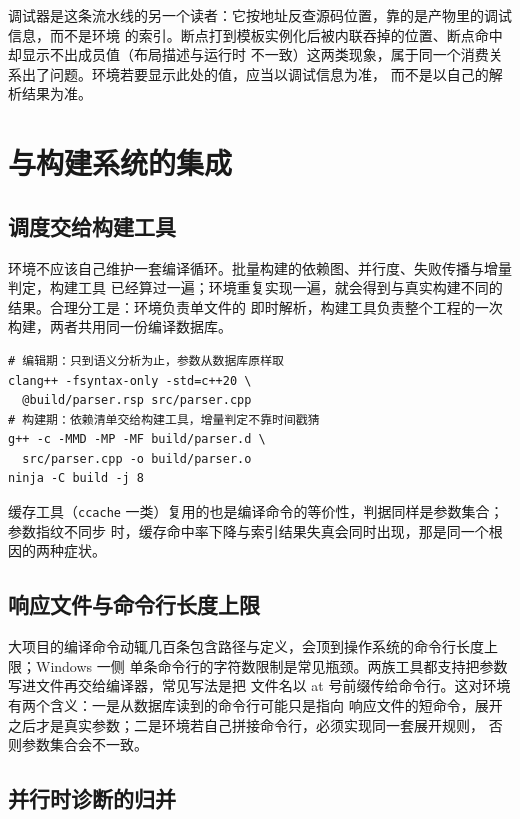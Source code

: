 \documentclass[12pt,a4paper,fontset=fandol]{ctexbook}
\newcommand{\Tool}[1]{\texttt{#1}}
\newcommand{\Win}{\textsf{Windows}}
\begin{document}
调试器是这条流水线的另一个读者：它按地址反查源码位置，靠的是产物里的调试信息，而不是环境
的索引。断点打到模板实例化后被内联吞掉的位置、断点命中却显示不出成员值（布局描述与运行时
不一致）这两类现象，属于同一个消费关系出了问题。环境若要显示此处的值，应当以调试信息为准，
而不是以自己的解析结果为准。

\section{与构建系统的集成}\label{sec:cl14-buildsys}

\subsection{调度交给构建工具}\label{sec:cl14-scheduling}

环境不应该自己维护一套编译循环。批量构建的依赖图、并行度、失败传播与增量判定，构建工具
已经算过一遍；环境重复实现一遍，就会得到与真实构建不同的结果。合理分工是：环境负责单文件的
即时解析，构建工具负责整个工程的一次构建，两者共用同一份编译数据库。

\begin{lstlisting}[style=shellstyle, caption={编辑期与构建期各走各的入口（示意）}]
# 编辑期：只到语义分析为止，参数从数据库原样取
clang++ -fsyntax-only -std=c++20 \
  @build/parser.rsp src/parser.cpp
# 构建期：依赖清单交给构建工具，增量判定不靠时间戳猜
g++ -c -MMD -MP -MF build/parser.d \
  src/parser.cpp -o build/parser.o
ninja -C build -j 8
\end{lstlisting}

缓存工具（\Tool{ccache} 一类）复用的也是编译命令的等价性，判据同样是参数集合；参数指纹不同步
时，缓存命中率下降与索引结果失真会同时出现，那是同一个根因的两种症状。

\subsection{响应文件与命令行长度上限}\label{sec:cl14-response}

大项目的编译命令动辄几百条包含路径与定义，会顶到操作系统的命令行长度上限；\Win{} 一侧
单条命令行的字符数限制是常见瓶颈。两族工具都支持把参数写进文件再交给编译器，常见写法是把
文件名以 at 号前缀传给命令行。这对环境有两个含义：一是从数据库读到的命令行可能只是指向
响应文件的短命令，展开之后才是真实参数；二是环境若自己拼接命令行，必须实现同一套展开规则，
否则参数集合会不一致。

\subsection{并行时诊断的归并}\label{sec:cl14-parallel}
\end{document}
